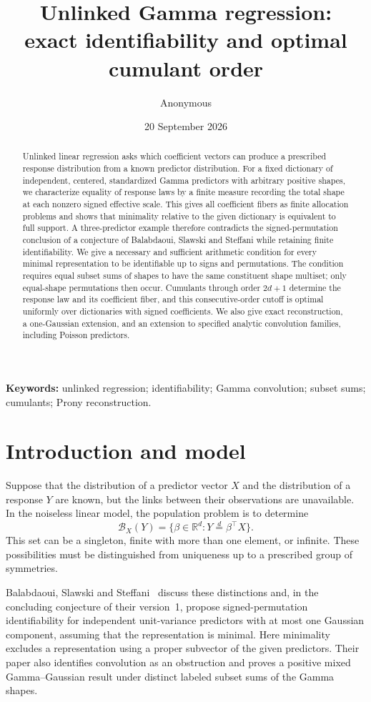 \documentclass[11pt]{article}
\title{Unlinked Gamma regression:\\exact identifiability and optimal cumulant order}
\author{Anonymous}
\date{20 September 2026}
\theoremstyle{definition}\newtheorem{definition}[theorem]{Definition}
\theoremstyle{remark}\newtheorem{remark}[theorem]{Remark}
\newcommand{\R}{\mathbb R}
\newcommand{\B}{\mathcal B}
\newcommand{\eqd}{\overset{d}{=}}
\begin{document}
\maketitle
\begin{abstract}
Unlinked linear regression asks which coefficient vectors can produce a prescribed response distribution from a known predictor distribution. For a fixed dictionary of independent, centered, standardized Gamma predictors with arbitrary positive shapes, we characterize equality of response laws by a finite measure recording the total shape at each nonzero signed effective scale. This gives all coefficient fibers as finite allocation problems and shows that minimality relative to the given dictionary is equivalent to full support. A three-predictor example therefore contradicts the signed-permutation conclusion of a conjecture of Balabdaoui, Slawski and Steffani while retaining finite identifiability. We give a necessary and sufficient arithmetic condition for every minimal representation to be identifiable up to signs and permutations. The condition requires equal subset sums of shapes to have the same constituent shape multiset; only equal-shape permutations then occur. Cumulants through order $2d+1$ determine the response law and its coefficient fiber, and this consecutive-order cutoff is optimal uniformly over dictionaries with signed coefficients. We also give exact reconstruction, a one-Gaussian extension, and an extension to specified analytic convolution families, including Poisson predictors.
\end{abstract}
\noindent\textbf{Keywords:} unlinked regression; identifiability; Gamma convolution; subset sums; cumulants; Prony reconstruction.

\section{Introduction and model}\label{sec:model}
Suppose that the distribution of a predictor vector $X$ and the distribution of a response $Y$ are known, but the links between their observations are unavailable. In the noiseless linear model, the population problem is to determine
\[
 \B_X(Y)=\{\beta\in\R^d:Y\eqd\beta^\top X\}.
\]
This set can be a singleton, finite with more than one element, or infinite. These possibilities must be distinguished from uniqueness up to a prescribed group of symmetries.

Balabdaoui, Slawski and Steffani~\cite{BSS} discuss these distinctions and, in the concluding conjecture of their version~1, propose signed-permutation identifiability for independent unit-variance predictors with at most one Gaussian component, assuming that the representation is minimal. Here minimality excludes a representation using a proper subvector of the given predictors. Their paper also identifies convolution as an obstruction and proves a positive mixed Gamma--Gaussian result under distinct labeled subset sums of the Gamma shapes.
\end{document}
